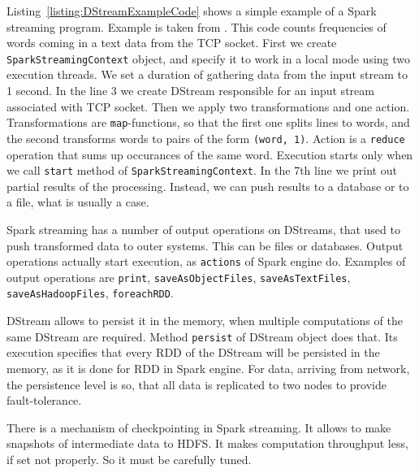 Listing~\ref{listing:DStreamExampleCode} shows a simple example of a Spark streaming program.
Example is taken from \cite{Spark2}.
This code counts frequencies of words coming in a text data from the TCP socket.
First we create \lstinline{SparkStreamingContext} object, and specify it to work in a local mode using two execution threads.
We set a duration of gathering data from the input stream to 1 second.
In the line 3 we create DStream responsible for an input stream associated with TCP socket.
Then we apply two transformations and one action.
Transformations are \lstinline{map}-functions, so that the first one splits lines to words, and the second transforms words to pairs of the form \lstinline{(word, 1)}.
Action is a \lstinline{reduce} operation that sums up occurances of the same word.
Execution starts only when we call \lstinline{start} method of \lstinline{SparkStreamingContext}.
In the 7th line we print out partial results of the processing.
Instead, we can push results to a database or to a file, what is usually a case.

Spark streaming has a number of output operations on DStreams, that used to push transformed data to outer systems.
This can be files or databases.
Output operations actually start execution, as \lstinline{actions} of Spark engine do.
Examples of output operations are \lstinline{print}, \lstinline{saveAsObjectFiles}, \lstinline{saveAsTextFiles}, \lstinline{saveAsHadoopFiles}, \lstinline{foreachRDD}.

DStream allows to persist it in the memory, when multiple computations of the same DStream are required.
Method \lstinline{persist} of DStream object does that.
Its execution specifies that every RDD of the DStream will be persisted in the memory, as it is done for RDD in Spark engine.
For data, arriving from network, the persistence level is so, that all data is replicated to two nodes to provide fault-tolerance.

There is a mechanism of checkpointing in Spark streaming.
It allows to make snapshots of intermediate data to HDFS.
It makes computation throughput less, if set not properly.
So it must be carefully tuned.